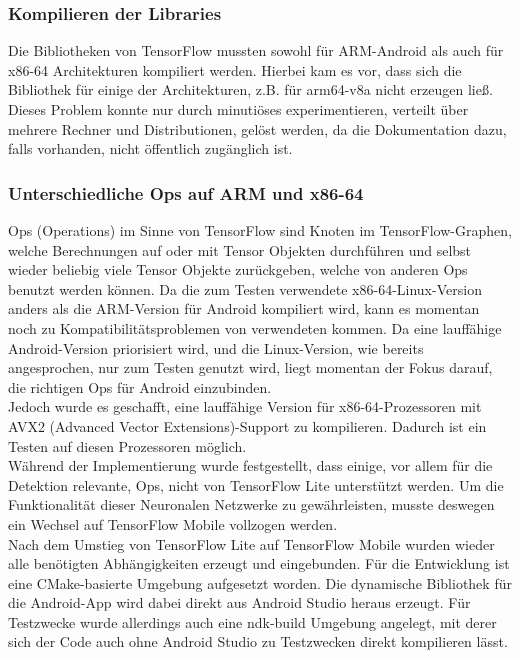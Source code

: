 \documentclass[12pt,a4paper,ngerman,enabledeprecatedfontcommands]{scrreprt}
\begin{document}
\subsubsection{Kompilieren der Libraries}
Die Bibliotheken von TensorFlow mussten sowohl für \gls{ARM}-Android als auch für x86-64 Architekturen kompiliert werden. Hierbei kam es vor, dass sich die Bibliothek für einige der Architekturen, z.B. für arm64-v8a nicht erzeugen ließ. Dieses Problem konnte nur durch minutiöses experimentieren, verteilt über mehrere Rechner und Distributionen, gelöst werden, da die Dokumentation dazu, falls vorhanden, nicht öffentlich zugänglich ist.\\

\subsubsection{Unterschiedliche Ops auf ARM und x86-64}
\glqq{}Ops\grqq{} (Operations) im Sinne von TensorFlow sind Knoten im TensorFlow-Graphen, welche Berechnungen auf oder mit Tensor Objekten durchführen und selbst wieder beliebig viele Tensor Objekte zurückgeben, welche von anderen Ops benutzt werden können.
Da die zum Testen verwendete x86-64-Linux-Version anders als die \gls{ARM}-Version für Android kompiliert wird, kann es momentan noch zu Kompatibilitätsproblemen von verwendeten  kommen.
Da eine lauffähige Android-Version priorisiert wird, und die Linux-Version, wie bereits angesprochen, nur zum Testen genutzt wird, liegt momentan der Fokus darauf, die richtigen Ops für Android einzubinden.\\
Jedoch wurde es geschafft, eine lauffähige Version für x86-64-Prozessoren mit AVX2 (Advanced Vector Extensions)-Support zu kompilieren. Dadurch ist ein Testen auf diesen Prozessoren möglich.\\

Während der Implementierung wurde festgestellt, dass einige, vor allem für die Detektion relevante, Ops, nicht von \gls{TensorFlow Lite} unterstützt werden. Um die Funktionalität dieser Neuronalen Netzwerke zu gewährleisten, musste deswegen ein Wechsel auf \gls{TensorFlow Mobile} vollzogen werden.\\
Nach dem Umstieg von \gls{TensorFlow Lite} auf \gls{TensorFlow Mobile} wurden wieder alle benötigten Abhängigkeiten erzeugt und eingebunden. Für die Entwicklung ist eine CMake-basierte Umgebung aufgesetzt worden. Die dynamische Bibliothek für die Android-\gls{App} wird dabei direkt aus Android Studio heraus erzeugt. Für Testzwecke wurde allerdings auch eine ndk-build Umgebung angelegt, mit derer sich der Code auch ohne Android Studio zu Testzwecken direkt kompilieren lässt.\\
\end{document}
